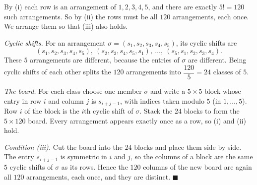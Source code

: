 By (i) each row is an arrangement of $1,2,3,4,5$, and there are exactly $5!=120$ such arrangements. So by (ii) the rows must be all $120$ arrangements, each once. We arrange them so that (iii) also holds.

\emph{Cyclic shifts.} For an arrangement $\sigma=\left(s_1,s_2,s_3,s_4,s_5\right)$, its cyclic shifts are
\[\left(s_1,s_2,s_3,s_4,s_5\right),\ \left(s_2,s_3,s_4,s_5,s_1\right),\ \dots,\ \left(s_5,s_1,s_2,s_3,s_4\right).\]
These $5$ arrangements are different, because the entries of $\sigma$ are different. Being cyclic shifts of each other splits the $120$ arrangements into $\dfrac{120}{5}=24$ classes of $5$.

\emph{The board.} For each class choose one member $\sigma$ and write a $5\times5$ block whose entry in row $i$ and column $j$ is $s_{i+j-1}$, with indices taken modulo $5$ (in $1,\dots,5$). Row $i$ of the block is the $i$th cyclic shift of $\sigma$. Stack the $24$ blocks to form the $5\times120$ board. Every arrangement appears exactly once as a row, so (i) and (ii) hold.

\emph{Condition (iii).} Cut the board into the $24$ blocks and place them side by side. The entry $s_{i+j-1}$ is symmetric in $i$ and $j$, so the columns of a block are the same $5$ cyclic shifts of $\sigma$ as its rows. Hence the $120$ columns of the new board are again all $120$ arrangements, each once, and they are distinct. $\blacksquare$
